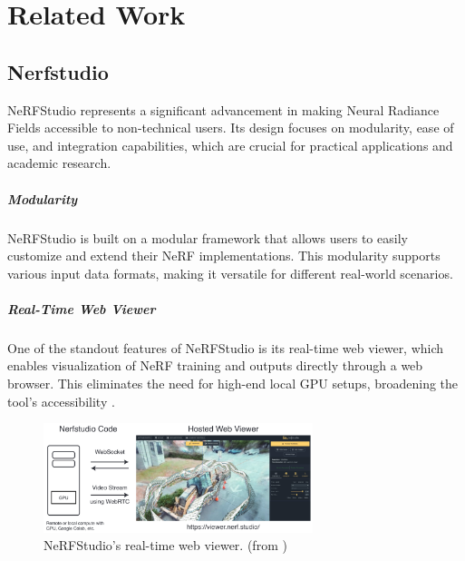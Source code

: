 %
\chapter{Related Work}
\label{sec:related}

\section{Nerfstudio}
\label{sec:related:nerfstudio}

NeRFStudio \cite{tancik_nerfstudio_2023} represents a significant advancement in making Neural Radiance Fields accessible to non-technical users. Its design focuses on modularity, ease of use, and integration capabilities, which are crucial for practical applications and academic research.

\paragraph{Modularity}
NeRFStudio is built on a modular framework that allows users to easily customize and extend their NeRF implementations. This modularity supports various input data formats, making it versatile for different real-world scenarios.

\paragraph{Real-Time Web Viewer}
One of the standout features of NeRFStudio is its real-time web viewer, which enables visualization of NeRF training and outputs directly through a web browser. This eliminates the need for high-end local GPU setups, broadening the tool's accessibility \cite{noauthor_nerfstudio-projectviser_2024}.

\begin{figure}[h!]
  \centering
  \includegraphics[width=0.7\textwidth]{figures/related-nerfstudio-viewer.png}
  \caption{NeRFStudio's real-time web viewer. (from \cite{tancik_nerfstudio_2023})}
  \label{fig:nerfstudio-viewer}
\end{figure}

